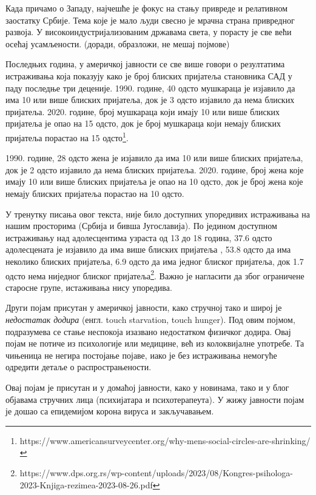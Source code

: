\documentclass[b5paper]{article}
\begin{document}
\large

Када причамо о Западу, најчешће је фокус на стању привреде и релативном заостатку Србије. Тема које је мало људи свесно је мрачна страна привредног развоја. У високоиндустријализованим државама света, у порасту је све већи осећај усамљености. (доради, образложи, не мешај појмове)

Последњих година, у америчкој јавности се све више говори о резултатима истраживања која показују како је број блиских пријатеља становника САД у паду последње три деценије. 1990. године, 40 одсто мушкараца је изјавило да има 10 или више блиских пријатеља, док је 3 одсто изјавило да нема блиских пријатеља. 2020. године, број мушкараца који имају 10 или више блиских пријатеља је опао на 15 одсто, док је број мушкараца који немају блиских пријатеља порастао на 15 одсто\footnote{https://www.americansurveycenter.org/why-mens-social-circles-are-shrinking/}.

1990. године, 28 одсто жена је изјавило да има 10 или више блиских пријатеља, док је 2 одсто изјавило да нема блиских пријатеља. 2020. године, број жена које имају 10 или више блиских пријатеља је опао на 10 одсто, док је број жена које немају блиских пријатеља порастао на 10 одсто.

У тренутку писања овог текста, није било доступних упоредивих истраживања на нашим просторима (Србија и бивша Југославија). По једином доступном истраживању над адолесцентима узраста од 13 до 18 година, 37.6 одсто адолесцената је изјавило да има више блиских пријатеља , 53.8 одсто да има неколико блиских пријатеља, 6.9 одсто да има једног блиског пријатеља, док 1.7 одсто нема ниједног блиског пријатеља\footnote{https://www.dps.org.rs/wp-content/uploads/2023/08/Kongres-psihologa-2023-Knjiga-rezimea-2023-08-26.pdf}. Важно је нагласити да због ограничене старосне групе, истаживања нису упоредива.

Други појам присутан у америчкој јавности, како стручној тако и широј је \textit{недостатак додира} (енгл. touch starvation, touch hunger). Под овим појмом, подразумева се стање неспокоја изазвано недостатком физичког додира. Овај појам не потиче из психологије или медицине, већ из колоквијалне употребе. Та чињеница не негира постојање појаве, иако је без истраживања немогуће одредити детаље о распрострањености.

Овај појам је присутан и у домаћој јавности, како у новинама, тако и у блог објавама стручних лица (психијатара и психотерапеута). У жижу јавности појам је дошао са епидемијом корона вируса и закључавањем.
\end{document}
